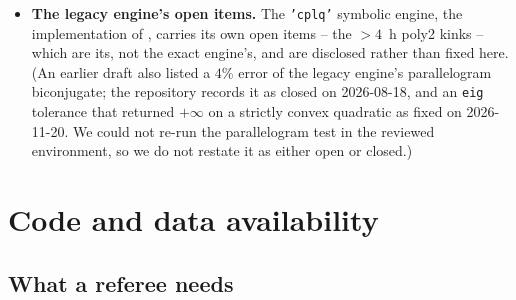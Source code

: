 \documentclass[11pt]{article}
\theoremstyle{definition}
\begin{document}
\begin{itemize}[nosep,leftmargin=*]
\item \textbf{The legacy engine's open items.} The \texttt{'cplq'} symbolic
  engine, the implementation of \citet{KARMARKAR-25,KARMARKAR-25a}, carries
  its own open items -- the $>4$~h poly2 kinks -- which are its, not the exact
  engine's, and are disclosed rather than fixed here. (An earlier draft also
  listed a $4\%$ error of the legacy engine's parallelogram biconjugate; the
  repository records it as closed on 2026-08-18, and an \texttt{eig} tolerance
  that returned $+\infty$ on a strictly convex quadratic as fixed on
  2026-11-20. We could not re-run the parallelogram test in the reviewed
  environment, so we do not restate it as either open or closed.)
\end{itemize}

\section{Code and data availability}

\subsection{What a referee needs}
\end{document}
